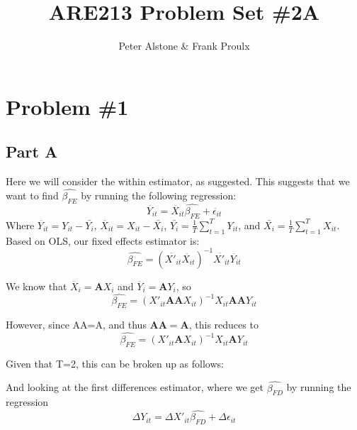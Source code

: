\documentclass[letterpaper, 12pt]{article}
\begin{document}
\title{ARE213 Problem Set \#2A}
\author{Peter Alstone \& Frank Proulx}
\maketitle

\section{Problem \#1}
\subsection{Part A}
Here we will consider the within estimator, as suggested. This suggests that we want to find $\widehat{\beta_{FE}}$ by running the following regression:
\begin{equation}
\ddot{Y_{it}} = \ddot{X_{it}}\widehat{\beta_{FE}} + \ddot{\epsilon_{it}}
\end{equation}
Where $\ddot{Y_{it}}=Y_{it}-\bar{Y_i}$, $\ddot{X_{it}}=X_{it}-\bar{X_i}$, $\bar{Y_i}=\frac{1}{T}\sum_{t=1}^TY_{it}$, and $\bar{X_i}=\frac{1}{T}\sum_{t=1}^TX_{it}$.
Based on OLS, our fixed effects estimator is:
\begin{equation}
\widehat{\beta_{FE}}=(\ddot{X'_{it}}\ddot{X_{it}})^{-1}\ddot{X'_{it}}\ddot{Y_{it}} %
\end{equation}

We know that $\ddot{X_{i}}=\boldsymbol{A}X_i$ and $\ddot{Y_{i}}=\boldsymbol{A}Y_{i}$, so
\begin{equation}
\widehat{\beta_{FE}} = (X'_{it}\boldsymbol{A}\boldsymbol{A}X_{it})^{-1} X_{it}\boldsymbol{A}\boldsymbol{A}Y_{it}
\end{equation}

However, since AA=A, and thus $\boldsymbol{AA}=\boldsymbol{A}$, this reduces to
\begin{equation}
\widehat{\beta_{FE}} = (X'_{it}\boldsymbol{A}X_{it})^{-1} X_{it} \boldsymbol{A} Y_{it}
\end{equation}

Given that T=2, this can be broken up as follows:





And looking at the first differences estimator, where we get $\widehat{\beta_{FD}}$ by running the regression
\begin{equation}
\Delta Y_{it} = \Delta X'_{it} \widehat{\beta_{FD}} + \Delta \epsilon_{it}
\end{equation}
\end{document}
